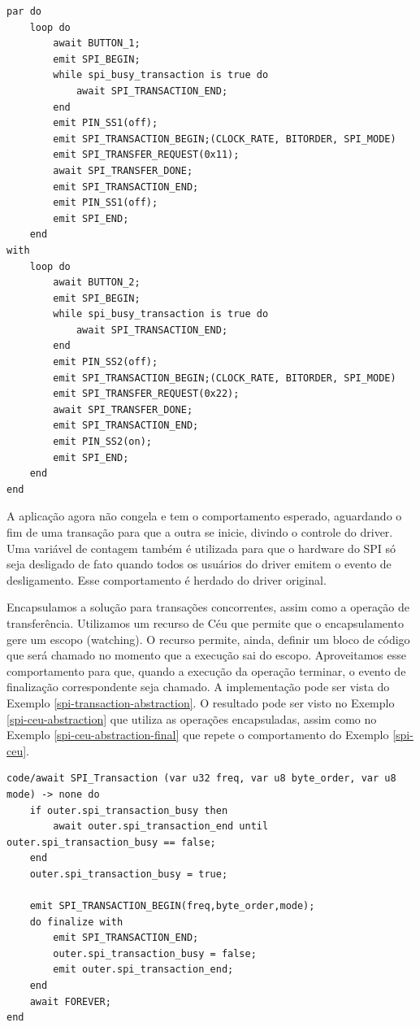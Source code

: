 \documentclass[11pt]{article}
\begin{document}
\begin{lstlisting}[style=CStyle,label=spi-block-solution,caption=Aplicação utiliza a variável para não congelar]
par do
    loop do
        await BUTTON_1;
        emit SPI_BEGIN;
        while spi_busy_transaction is true do
            await SPI_TRANSACTION_END;
        end
        emit PIN_SS1(off);
        emit SPI_TRANSACTION_BEGIN;(CLOCK_RATE, BITORDER, SPI_MODE)
        emit SPI_TRANSFER_REQUEST(0x11);
        await SPI_TRANSFER_DONE;
        emit SPI_TRANSACTION_END;
        emit PIN_SS1(off);
        emit SPI_END;
    end
with
    loop do
        await BUTTON_2;
        emit SPI_BEGIN;
        while spi_busy_transaction is true do
            await SPI_TRANSACTION_END;
        end
        emit PIN_SS2(off);
        emit SPI_TRANSACTION_BEGIN;(CLOCK_RATE, BITORDER, SPI_MODE)
        emit SPI_TRANSFER_REQUEST(0x22);
        await SPI_TRANSFER_DONE;
        emit SPI_TRANSACTION_END;
        emit PIN_SS2(on);
        emit SPI_END;
    end
end
\end{lstlisting}
\par A aplicação agora não congela e tem o comportamento esperado, aguardando o fim de uma transação para que a outra se inicie, divindo o controle do driver. Uma variável de contagem também é utilizada para que o hardware do SPI só seja desligado de fato quando todos os usuários do driver emitem o evento de desligamento. Esse comportamento é herdado do driver original. 
\par Encapsulamos a solução para transações concorrentes, assim como a operação de transferência. Utilizamos um recurso de Céu que permite que o encapsulamento gere um escopo (watching). O recurso permite, ainda, definir um bloco de código que será chamado no momento que a execução sai do escopo. Aproveitamos esse comportamento para que, quando a execução da operação terminar, o evento de finalização correspondente seja chamado. A implementação pode ser vista do Exemplo \ref{spi-transaction-abstraction}. O resultado pode ser visto no Exemplo \ref{spi-ceu-abstraction} que utiliza as operações encapsuladas, assim como no Exemplo \ref{spi-ceu-abstraction-final} que repete o comportamento do Exemplo \ref{spi-ceu}.
\begin{lstlisting}[style=CStyle,label=spi-transaction-abstraction,caption=Implementação do encapsulamento para transação]
code/await SPI_Transaction (var u32 freq, var u8 byte_order, var u8 mode) -> none do
    if outer.spi_transaction_busy then
        await outer.spi_transaction_end until outer.spi_transaction_busy == false;
    end
    outer.spi_transaction_busy = true;

    emit SPI_TRANSACTION_BEGIN(freq,byte_order,mode);
    do finalize with
        emit SPI_TRANSACTION_END;
        outer.spi_transaction_busy = false;
        emit outer.spi_transaction_end;
    end
    await FOREVER;
end
\end{lstlisting}
\end{document}
